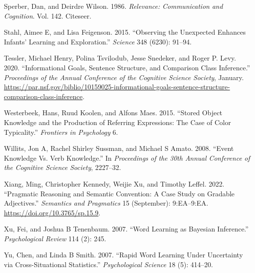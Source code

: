 \documentclass{ucetd}
\newlength{\cslhangindent}
\newenvironment{cslreferences}%
{\setlength{\parindent}{0pt}%
\everypar{\setlength{\hangindent}{\cslhangindent}}\ignorespaces}%
{\par}
\begin{document}
\begin{cslreferences}
\leavevmode\hypertarget{ref-sperber1986relevance}{}%
Sperber, Dan, and Deirdre Wilson. 1986. \emph{Relevance: Communication
and Cognition}. Vol. 142. Citeseer.

\leavevmode\hypertarget{ref-stahl2015}{}%
Stahl, Aimee E, and Lisa Feigenson. 2015. ``Observing the Unexpected
Enhances Infants' Learning and Exploration.'' \emph{Science} 348 (6230):
91--94.

\leavevmode\hypertarget{ref-tessler_informational_2020}{}%
Tessler, Michael Henry, Polina Tsvilodub, Jesse Snedeker, and Roger P.
Levy. 2020. ``Informational Goals, Sentence Structure, and Comparison
Class Inference.'' \emph{Proceedings of the Annual Conference of the
Cognitive Science Society}, January.
\url{https://par.nsf.gov/biblio/10159025-informational-goals-sentence-structure-comparison-class-inference}.

\leavevmode\hypertarget{ref-westerbeek2015}{}%
Westerbeek, Hans, Ruud Koolen, and Alfons Maes. 2015. ``Stored Object
Knowledge and the Production of Referring Expressions: The Case of Color
Typicality.'' \emph{Frontiers in Psychology} 6.

\leavevmode\hypertarget{ref-willits2008}{}%
Willits, Jon A, Rachel Shirley Sussman, and Michael S Amato. 2008.
``Event Knowledge Vs. Verb Knowledge.'' In \emph{Proceedings of the 30th
Annual Conference of the Cognitive Science Society}, 2227--32.

\leavevmode\hypertarget{ref-xiang_pragmatic_2022}{}%
Xiang, Ming, Christopher Kennedy, Weijie Xu, and Timothy Leffel. 2022.
``Pragmatic Reasoning and Semantic Convention: A Case Study on Gradable
Adjectives.'' \emph{Semantics and Pragmatics} 15 (September):
9:EA--9:EA. \url{https://doi.org/10.3765/sp.15.9}.

\leavevmode\hypertarget{ref-xu2007}{}%
Xu, Fei, and Joshua B Tenenbaum. 2007. ``Word Learning as Bayesian
Inference.'' \emph{Psychological Review} 114 (2): 245.

\leavevmode\hypertarget{ref-yu2007}{}%
Yu, Chen, and Linda B Smith. 2007. ``Rapid Word Learning Under
Uncertainty via Cross-Situational Statistics.'' \emph{Psychological
Science} 18 (5): 414--20.
\end{cslreferences}


\makebibliography

%
%
\end{document}
